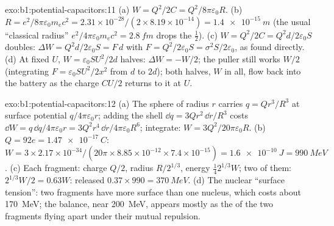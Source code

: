 \begin{solution}{exo:b1:potential-capacitors:11}
(a) $W = Q^2/2C = Q^2/8\pi\varepsilon_0R$. (b) $R = e^2/8\pi\varepsilon_0m_ec^2 = 2.31 \times
10^{-28}/(2 \times 8.19 \times 10^{-14}) = \qty{1.4e-15}{m}$ (the usual ``classical
radius'' $e^2/4\pi\varepsilon_0m_ec^2 = \qty{2.8}{fm}$ drops the $\tfrac12$). (c) $W =
Q^2/2C = Q^2d/2\varepsilon_0S$ doubles: $\Delta W = Q^2d/2\varepsilon_0S = F\,d$ with $F =
Q^2/2\varepsilon_0S = \sigma^2S/2\varepsilon_0$, as found directly. (d) At fixed $U$, $W =
\varepsilon_0SU^2/2d$ halves: $\Delta W = -W/2$; the puller still works $W/2$
(integrating $F = \varepsilon_0SU^2/2x^2$ from $d$ to $2d$); both halves, $W$ in
all, flow back into the battery as the charge $CU/2$ returns to it at
 $U$.
\end{solution}

\begin{solution}{exo:b1:potential-capacitors:12}
(a) The sphere of radius $r$ carries $q = Qr^3/R^3$ at surface potential
$q/4\pi\varepsilon_0r$; adding the shell $\dd q = 3Qr^2\,\dd r/R^3$ costs $\dd W =
q\,\dd q/4\pi\varepsilon_0r = 3Q^2r^4\,\dd r/4\pi\varepsilon_0R^6$; integrate: $W =
3Q^2/20\pi\varepsilon_0R$. (b) $Q = 92e = \qty{1.47e-17}{C}$: $W = 3 \times 2.17 \times
10^{-34}/(20\pi \times 8.85 \times 10^{-12} \times 7.4 \times 10^{-15}) = \qty{1.6e-10}{J}
= \qty{990}{MeV}$. (c) Each fragment: charge $Q/2$, radius $R/2^{1/3}$,
energy $\tfrac14 2^{1/3}W$; two of them: $2^{1/3}W/2 = 0.63W$: released
$0.37 \times 990 = \qty{370}{MeV}$. (d) The nuclear ``surface tension'':
two fragments have more surface than one nucleus, which costs about
\qty{170}{MeV}; the balance, near \qty{200}{MeV}, appears mostly as the
 of the two fragments flying apart under their mutual
repulsion.
\end{solution}


